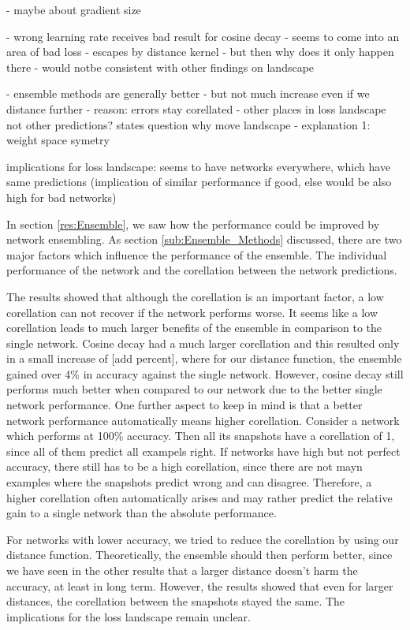 -  maybe about gradient size
 

- wrong learning rate receives bad result for   cosine decay
- seems to come into an area of bad loss
-  escapes by  distance kernel
- but then why does it only happen there
- would notbe consistent with other findings on landscape



- ensemble methods are generally better
- but not much  increase even if we distance further
- reason: errors stay corellated
- other places in loss landscape not other predictions? states question why move landscape
- explanation 1: weight space symetry

implications for loss landscape: seems to have networks everywhere, which have
same predictions (implication of similar performance if good, else would be also
high for bad networks)

In section \ref{res:Ensemble}, we saw how the performance could be improved by
network ensembling. As section \ref{sub:Ensemble_Methods} discussed, there are
two major factors which influence the performance of the ensemble. The
individual performance of the network and the corellation between the network
predictions.

The results showed that although the corellation is an important factor, a low
corellation can not recover if the network performs worse. It seems like a low
corellation leads to much larger benefits of the ensemble in comparison to the
single network. Cosine decay had a much larger corellation and this resulted
only in a small increase of [add percent], where for our distance function, the
ensemble gained over 4\% in accuracy against the single network. However, cosine
decay still performs much better when compared to our network due to the better
single network performance. One further aspect to keep in mind is that a better
network performance automatically means higher corellation. Consider a network
which performs at 100\% accuracy. Then all its snapshots have a corellation of
1, since all of them predict all exampels right. If networks have high but not
perfect accuracy, there still has to be a high corellation, since there are not
mayn examples where the snapshots predict wrong and can disagree. Therefore, a
higher corellation often automatically arises and may rather predict the
relative gain to a single network than the absolute performance.

For networks with lower accuracy, we tried to reduce the corellation by using
our distance function. Theoretically, the ensemble should then perform better,
since we have seen in the other results that a larger distance doesn't harm the
accuracy, at least in long term. However, the results showed that even for
larger distances, the corellation between the snapshots stayed the same. The
implications for the loss landscape remain unclear.

